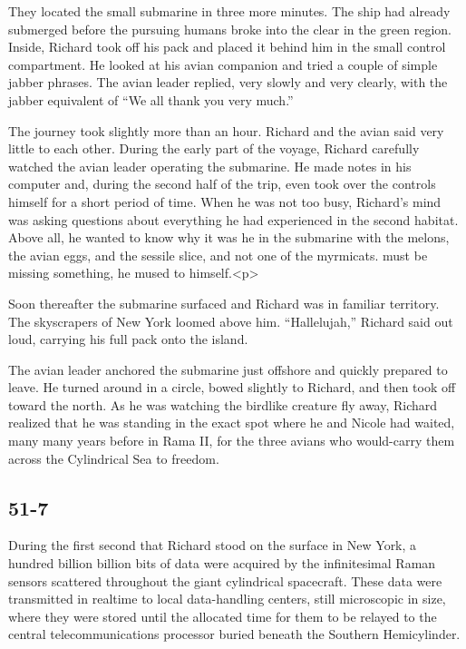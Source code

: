 \documentclass[]{article}
\begin{document}
{{They located the small submarine in three more minutes. The ship had already submerged before the pursuing humans broke into the clear in the green region. Inside, Richard took off his pack and placed it behind him in the small control compartment. He looked at his avian companion and tried a couple of simple jabber phrases. The avian leader replied, very slowly and very clearly, with the jabber equivalent of “We all thank you very much.”

The journey took slightly more than an hour. Richard and the avian said very little to each other. During the early part of the voyage, Richard carefully watched the avian leader operating the submarine. He made notes in his computer and, during the second half of the trip, even took over the controls himself for a short period of time. When he was not too busy, Richard’s mind was asking questions about everything he had experienced in the second habitat. Above all, he wanted to know why it was he in the submarine with the melons, the avian eggs, and the sessile slice, and not one of the myrmicats. must be missing something, he mused to himself.<p>

Soon thereafter the submarine surfaced and Richard was in familiar territory. The skyscrapers of New York loomed above him. “Hallelujah,” Richard said out loud, carrying his full pack onto the island.

The avian leader anchored the submarine just offshore and quickly prepared to leave. He turned around in a circle, bowed slightly to Richard, and then took off toward the north. As he was watching the birdlike creature fly away, Richard realized that he was standing in the exact spot where he and Nicole had waited, many many years before in Rama II, for the three avians who would-carry them across the Cylindrical Sea to freedom.


\subsection{51-7}

During the first second that Richard stood on the surface in New York, a hundred billion billion bits of data were acquired by the infinitesimal Raman sensors scattered throughout the giant cylindrical spacecraft. These data were transmitted in realtime to local data-handling centers, still microscopic in size, where they were stored until the allocated time for them to be relayed to the central telecommunications processor buried beneath the Southern Hemicylinder.

}}
\end{document}
